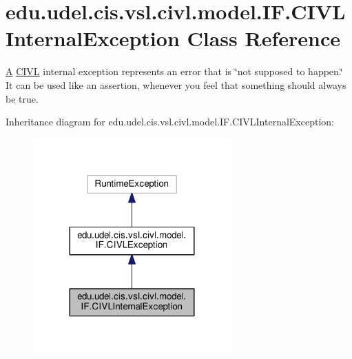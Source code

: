 \hypertarget{classedu_1_1udel_1_1cis_1_1vsl_1_1civl_1_1model_1_1IF_1_1CIVLInternalException}{}\section{edu.\+udel.\+cis.\+vsl.\+civl.\+model.\+I\+F.\+C\+I\+V\+L\+Internal\+Exception Class Reference}
\label{classedu_1_1udel_1_1cis_1_1vsl_1_1civl_1_1model_1_1IF_1_1CIVLInternalException}


\hyperlink{structA}{A} \hyperlink{classedu_1_1udel_1_1cis_1_1vsl_1_1civl_1_1CIVL}{C\+I\+V\+L} internal exception represents an error that is \char`\"{}not supposed to happen.\char`\"{} It can be used like an assertion, whenever you feel that something should always be true.  




Inheritance diagram for edu.\+udel.\+cis.\+vsl.\+civl.\+model.\+I\+F.\+C\+I\+V\+L\+Internal\+Exception\+:
\nopagebreak
\begin{figure}[H]
\begin{center}
\leavevmode
\includegraphics[width=215pt]{classedu_1_1udel_1_1cis_1_1vsl_1_1civl_1_1model_1_1IF_1_1CIVLInternalException__inherit__graph}
\end{center}
\end{figure}


